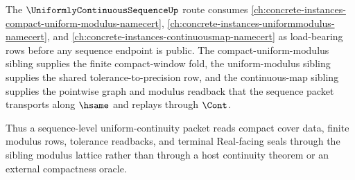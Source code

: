 The $\UniformlyContinuousSequenceUp$ route consumes \autoref{ch:concrete-instances-compact-uniform-modulus-namecert}, \autoref{ch:concrete-instances-uniformmodulus-namecert}, and \autoref{ch:concrete-instances-continuousmap-namecert} as load-bearing rows before any sequence endpoint is public. The compact-uniform-modulus sibling supplies the finite compact-window fold, the uniform-modulus sibling supplies the shared tolerance-to-precision row, and the continuous-map sibling supplies the pointwise graph and modulus readback that the sequence packet transports along $\hsame$ and replays through $\Cont$.

Thus a sequence-level uniform-continuity packet reads compact cover data, finite modulus rows, tolerance readbacks, and terminal Real-facing seals through the sibling modulus lattice rather than through a host continuity theorem or an external compactness oracle.
